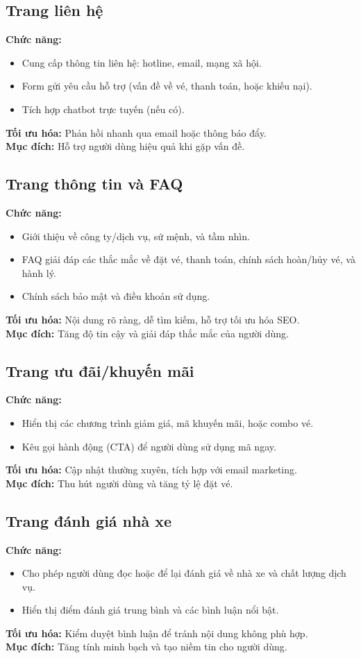 \subsection*{Trang liên hệ}
\textbf{Chức năng:}
\begin{itemize}
    \item Cung cấp thông tin liên hệ: hotline, email, mạng xã hội.
    \item Form gửi yêu cầu hỗ trợ (vấn đề về vé, thanh toán, hoặc khiếu nại).
    \item Tích hợp chatbot trực tuyến (nếu có).
\end{itemize}
\textbf{Tối ưu hóa:} Phản hồi nhanh qua email hoặc thông báo đẩy.\\
\textbf{Mục đích:} Hỗ trợ người dùng hiệu quả khi gặp vấn đề.

\subsection*{Trang thông tin và FAQ}
\textbf{Chức năng:}
\begin{itemize}
    \item Giới thiệu về công ty/dịch vụ, sứ mệnh, và tầm nhìn.
    \item FAQ giải đáp các thắc mắc về đặt vé, thanh toán, chính sách hoàn/hủy vé, và hành lý.
    \item Chính sách bảo mật và điều khoản sử dụng.
\end{itemize}
\textbf{Tối ưu hóa:} Nội dung rõ ràng, dễ tìm kiếm, hỗ trợ tối ưu hóa SEO.\\
\textbf{Mục đích:} Tăng độ tin cậy và giải đáp thắc mắc của người dùng.

\subsection*{Trang ưu đãi/khuyến mãi}
\textbf{Chức năng:}
\begin{itemize}
    \item Hiển thị các chương trình giảm giá, mã khuyến mãi, hoặc combo vé.
    \item Kêu gọi hành động (CTA) để người dùng sử dụng mã ngay.
\end{itemize}
\textbf{Tối ưu hóa:} Cập nhật thường xuyên, tích hợp với email marketing.\\
\textbf{Mục đích:} Thu hút người dùng và tăng tỷ lệ đặt vé.

\subsection*{Trang đánh giá nhà xe}
\textbf{Chức năng:}
\begin{itemize}
    \item Cho phép người dùng đọc hoặc để lại đánh giá về nhà xe và chất lượng dịch vụ.
    \item Hiển thị điểm đánh giá trung bình và các bình luận nổi bật.
\end{itemize}
\textbf{Tối ưu hóa:} Kiểm duyệt bình luận để tránh nội dung không phù hợp.\\
\textbf{Mục đích:} Tăng tính minh bạch và tạo niềm tin cho người dùng.

